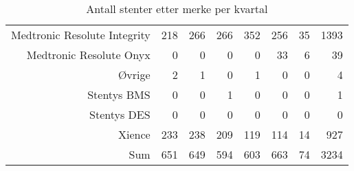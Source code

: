 \documentclass[presentation,xcolor=pdftex,dvipsnames,table]{beamer}
\begin{document}
\begin{frame}
\begin{tiny}
\begin{table}[ht]
\begin{tabular}{rrrrrrrr}
  Medtronic Resolute Integrity & 218 & 266 & 266 & 352 & 256 & 35 & 1393 \\ 
  Medtronic Resolute Onyx & 0 & 0 & 0 & 0 & 33 & 6 & 39 \\ 
  Øvrige & 2 & 1 & 0 & 1 & 0 & 0 & 4 \\ 
  Stentys BMS & 0 & 0 & 1 & 0 & 0 & 0 & 1 \\ 
  Stentys DES & 0 & 0 & 0 & 0 & 0 & 0 & 0 \\ 
  Xience & 233 & 238 & 209 & 119 & 114 & 14 & 927 \\ 
  Sum & 651 & 649 & 594 & 603 & 663 & 74 & 3234 \\ 
   \bottomrule
\end{tabular}
\caption{Antall stenter etter merke per kvartal} 
\end{table}\end{tiny}
\end{frame}
\end{document}
